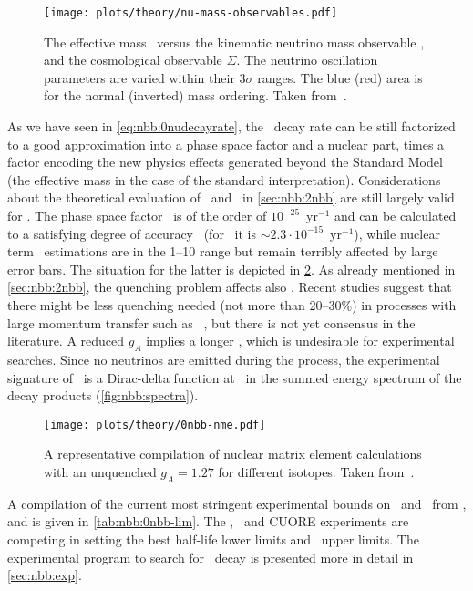 \begin{figure}
  \centering
  \texttt{[image: plots/theory/nu-mass-observables.pdf]}
  \caption{%
    The effective mass \mbb\ versus the kinematic neutrino mass observable
    \mb, and the cosmological observable $\Sigma$. The neutrino
    oscillation parameters are varied within their $3\sigma$ ranges. The blue
    (red) area is for the normal (inverted) mass ordering. Taken
    from~\cite{Dolinski2019}.
  }\label{fig:nbb:mass-obs}
\end{figure}

As we have seen in \cref{eq:nbb:0nudecayrate}, the \onbb\ decay rate can be still
factorized to a good approximation into a phase space factor and a nuclear part, times a
factor encoding the new physics effects generated beyond the Standard Model (the effective
mass in the case of the standard interpretation). Considerations about the theoretical
evaluation of \psft\ and \nmet\ in \cref{sec:nbb:2nbb} are still largely valid for \onbb.
The phase space factor \psfz\ is of the order of $10^{-25}$~yr$^{-1}$ and can be
calculated to a satisfying degree of accuracy~\cite{Kotila2012, Stoica2013} (for \gesix\
it is ${\sim}2.3 \cdot 10^{-15}$~yr$^{-1}$), while nuclear term \nmez\ estimations are in
the 1--10 range but remain terribly affected by large error bars. The situation for the
latter is depicted in \cref{fig:nbb:nme}. As already mentioned in \cref{sec:nbb:2nbb}, the
quenching problem affects also \onbb. Recent studies suggest that there might be less
quenching needed (not more than 20--30\%) in processes with large momentum transfer such
as \onbb~\cite{?}, but there is not yet consensus in the literature. A reduced $g_A$
implies a longer \thalfzero, which is undesirable for experimental searches.  Since no
neutrinos are emitted during the process, the experimental signature of \onbb\ is a
Dirac-delta function at \qbb\ in the summed energy spectrum of the decay products
(\cref{fig:nbb:spectra}).

\begin{figure}
  \centering
  \texttt{[image: plots/theory/0nbb-nme.pdf]}
  \caption{%
    A representative compilation of nuclear matrix element calculations with an unquenched
    $g_A=1.27$ for different isotopes. Taken from~\cite{Yao2020}. \fillme{replace this
    with plot in \cite{Engel2017}?}
  }\label{fig:nbb:nme}
\end{figure}

A compilation of the current most stringent experimental bounds on \thalfzero\ and \mbb\
from \gesix,  and  is given in \cref{tab:nbb:0nbb-lim}. The
\gerda, \kamlandzen\ and CUORE experiments are competing in setting the best half-life
lower limits and \mbb\ upper limits. The experimental program to search for \onbb\ decay
is presented more in detail in \cref{sec:nbb:exp}.

